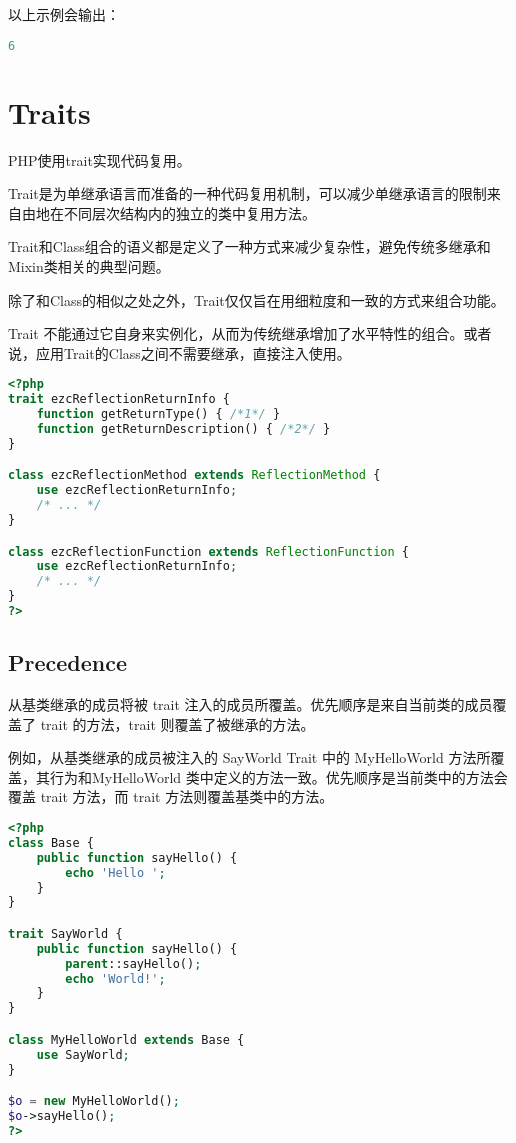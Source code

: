 以上示例会输出：

\begin{lstlisting}[language=PHP]
6
\end{lstlisting}

\chapter{Traits}


PHP使用trait实现代码复用。

Trait是为单继承语言而准备的一种代码复用机制，可以减少单继承语言的限制来自由地在不同层次结构内的独立的类中复用方法。

Trait和Class组合的语义都是定义了一种方式来减少复杂性，避免传统多继承和Mixin类相关的典型问题。

除了和Class的相似之处之外，Trait仅仅旨在用细粒度和一致的方式来组合功能。

Trait 不能通过它自身来实例化，从而为传统继承增加了水平特性的组合。或者说，应用Trait的Class之间不需要继承，直接注入使用。

\begin{lstlisting}[language=PHP]
<?php
trait ezcReflectionReturnInfo {
    function getReturnType() { /*1*/ }
    function getReturnDescription() { /*2*/ }
}

class ezcReflectionMethod extends ReflectionMethod {
    use ezcReflectionReturnInfo;
    /* ... */
}

class ezcReflectionFunction extends ReflectionFunction {
    use ezcReflectionReturnInfo;
    /* ... */
}
?>
\end{lstlisting}


\section{Precedence}

从基类继承的成员将被 trait 注入的成员所覆盖。优先顺序是来自当前类的成员覆盖了 trait 的方法，trait 则覆盖了被继承的方法。

例如，从基类继承的成员被注入的 SayWorld Trait 中的 MyHelloWorld 方法所覆盖，其行为和MyHelloWorld 类中定义的方法一致。优先顺序是当前类中的方法会覆盖 trait 方法，而 trait 方法则覆盖基类中的方法。

\begin{lstlisting}[language=PHP]
<?php
class Base {
    public function sayHello() {
        echo 'Hello ';
    }
}

trait SayWorld {
    public function sayHello() {
        parent::sayHello();
        echo 'World!';
    }
}

class MyHelloWorld extends Base {
    use SayWorld;
}

$o = new MyHelloWorld();
$o->sayHello();
?>
\end{lstlisting}


